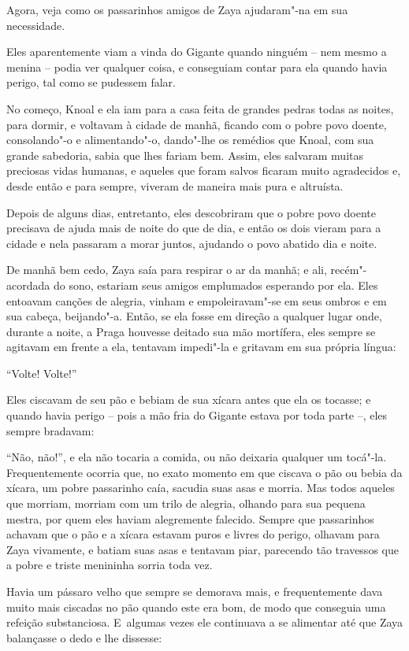 Agora, veja como os passarinhos amigos de Zaya ajudaram"-na em sua
necessidade.

Eles aparentemente viam a vinda do Gigante quando ninguém -- nem mesmo a
menina -- podia ver qualquer coisa, e conseguiam contar para ela quando
havia perigo, tal como se pudessem falar.

No começo, Knoal e ela iam para a casa feita de grandes pedras todas as
noites, para dormir, e voltavam à cidade de manhã, ficando com o pobre
povo doente, consolando"-o e alimentando"-o, dando"-lhe os remédios que
Knoal, com sua grande sabedoria, sabia que lhes fariam bem. Assim, eles
salvaram muitas preciosas vidas humanas, e aqueles que foram salvos
ficaram muito agradecidos e, desde então e para sempre, viveram de
maneira mais pura e altruísta.

Depois de alguns dias, entretanto, eles descobriram que o pobre povo
doente precisava de ajuda mais de noite do que de dia, e então os dois
vieram para a cidade e nela passaram a morar juntos, ajudando o povo
abatido dia e noite.

De manhã bem cedo, Zaya saía para respirar o ar da manhã; e ali,
recém"-acordada do sono, estariam seus amigos emplumados esperando por
ela. Eles entoavam canções de alegria, vinham e empoleiravam"-se em seus
ombros e em sua cabeça, beijando"-a. Então, se ela fosse em direção a
qualquer lugar onde, durante a noite, a Praga houvesse deitado sua mão
mortífera, eles sempre se agitavam em frente a ela, tentavam impedi"-la e
gritavam em sua própria língua:

``Volte! Volte!''

Eles ciscavam de seu pão e bebiam de sua xícara antes que ela os
tocasse; e quando havia perigo -- pois a mão fria do Gigante estava por
toda parte --, eles sempre bradavam:

``Não, não!'', e ela não tocaria a comida, ou não deixaria qualquer um
tocá"-la. Frequentemente ocorria que, no exato momento em que ciscava o
pão ou bebia da xícara, um pobre passarinho caía, sacudia suas asas e
morria. Mas todos aqueles que morriam, morriam com um trilo de alegria,
olhando para sua pequena mestra, por quem eles haviam alegremente
falecido. Sempre que passarinhos achavam que o pão e a xícara estavam
puros e livres do perigo, olhavam para Zaya vivamente, e batiam suas
asas e tentavam piar, parecendo tão travessos que a pobre e triste
menininha sorria toda vez.

Havia um pássaro velho que sempre se demorava mais, e frequentemente
dava muito mais ciscadas no pão quando este era bom, de modo que
conseguia uma refeição substanciosa. E~algumas vezes ele continuava a se
alimentar até que Zaya balançasse o dedo e lhe dissesse:

